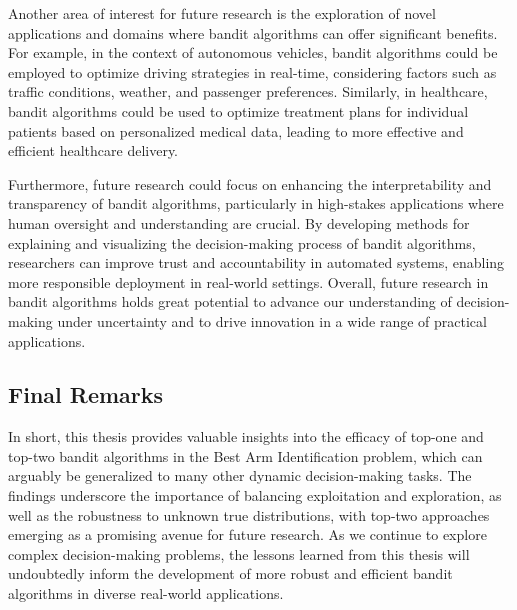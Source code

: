 \documentclass[a4paper, 12pt]{article}
\theoremstyle{definition}
\begin{document}
Another area of interest for future research is the exploration of novel applications and domains where bandit algorithms can offer significant benefits. For example, in the context of autonomous vehicles, bandit algorithms could be employed to optimize driving strategies in real-time, considering factors such as traffic conditions, weather, and passenger preferences. Similarly, in healthcare, bandit algorithms could be used to optimize treatment plans for individual patients based on personalized medical data, leading to more effective and efficient healthcare delivery.

Furthermore, future research could focus on enhancing the interpretability and transparency of bandit algorithms, particularly in high-stakes applications where human oversight and understanding are crucial. By developing methods for explaining and visualizing the decision-making process of bandit algorithms, researchers can improve trust and accountability in automated systems, enabling more responsible deployment in real-world settings. Overall, future research in bandit algorithms holds great potential to advance our understanding of decision-making under uncertainty and to drive innovation in a wide range of practical applications.


\subsection{Final Remarks}
In short, this thesis provides valuable insights into the efficacy of top-one and top-two bandit algorithms in the Best Arm Identification problem, which can arguably be generalized to many other dynamic decision-making tasks. The findings underscore the importance of balancing exploitation and exploration, as well as the robustness to unknown true distributions, with top-two approaches emerging as a promising avenue for future research. As we continue to explore complex decision-making problems, the lessons learned from this thesis will undoubtedly inform the development of more robust and efficient bandit algorithms in diverse real-world applications.



\newpage



\end{document}
